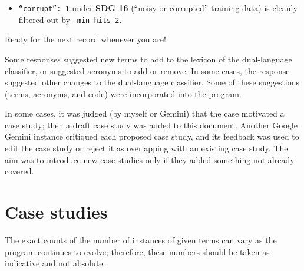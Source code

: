 \begin{llmoutput}
\begin{itemize}
\begin{itemize}
    \item \texttt{\enquote{corrupt}: 1} under \textbf{SDG 16} (\enquote{noisy or corrupted} training data) is cleanly filtered out by \texttt{--min-hits 2}.
    \end{itemize}
\end{itemize}

Ready for the next record whenever you are!
\end{llmoutput}


Some responses suggested new terms to add to the lexicon of the dual-language classifier, or suggested acronyms to add or remove. In some cases, the response suggested other changes to the dual-language classifier. Some of these suggestions (terms, acronyms, and code) were incorporated into the program.

In some cases, it was judged (by myself or Gemini) that the case motivated a case study; then a draft case study was added to this document. Another Google Gemini instance critiqued each proposed case study, and its feedback was used to edit the case study or reject it as overlapping with an existing case study. The aim was to introduce new case studies only if they added something not already covered.

\section{Case studies}
\label{sec:CaseStudies}
The exact counts of the number of instances of given terms can vary as the program continues to evolve; therefore, these numbers should be taken as indicative and not absolute.


